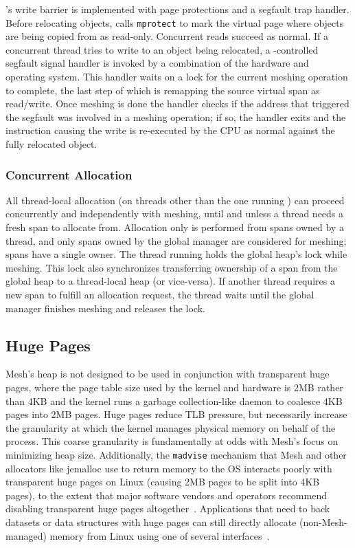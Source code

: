\Mesh's write barrier is implemented with page protections and a
segfault trap handler.  Before relocating objects, \Mesh calls
\texttt{mprotect} to mark the virtual page where objects are being
copied from as read-only.  Concurrent reads succeed as normal.  If a
concurrent thread tries to write to an object being relocated, a
\Mesh-controlled segfault signal handler is invoked by a combination
of the hardware and operating system.  This handler waits on a lock
for the current meshing operation to complete, the last step of which
is remapping the source virtual span as read/write.  Once meshing is
done the handler checks if the address that triggered the segfault was
involved in a meshing operation; if so, the handler exits and the
instruction causing the write is re-executed by the CPU as normal
against the fully relocated object.


\subsubsection{Concurrent Allocation}

All thread-local allocation (on threads other than the one running
\sm) can proceed concurrently and independently with meshing, until
and unless a thread needs a fresh span to allocate from.  Allocation
only is performed from spans owned by a thread, and only spans owned
by the global manager are considered for meshing; spans have a single
owner.  The thread running \sm holds the global heap's lock while
meshing.  This lock also synchronizes transferring ownership of a span
from the global heap to a thread-local heap (or vice-versa).  If
another thread requires a new span to fulfill an allocation request,
the thread waits until the global manager finishes meshing and
releases the lock.

\subsection{Huge Pages}

Mesh's heap is not designed to be used in conjunction with transparent
huge pages, where the page table size used by the kernel and hardware
is 2MB rather than 4KB and the kernel runs a garbage collection-like
daemon to coalesce 4KB pages into 2MB pages.  Huge pages reduce TLB
pressure, but necessarily increase the granularity at which the kernel
manages physical memory on behalf of the process. This coarse
granularity is fundamentally at odds with Mesh's focus on minimizing
heap size.  Additionally, the \texttt{madvise} mechanism that Mesh and
other allocators like jemalloc use to return memory to the OS
interacts poorly with transparent huge pages on Linux (causing 2MB
pages to be split into 4KB pages), to the extent that major software
vendors and operators recommend disabling transparent huge pages
altogether~\cite{cloudera:thb,redis:thb,mongodb:thb,oracle:thb,nelson:thb}.
Applications that need to back datasets or data structures with huge
pages can still directly allocate (non-Mesh-managed) memory from Linux
using one of several interfaces~\cite{lwn:hp-interfaces}.

